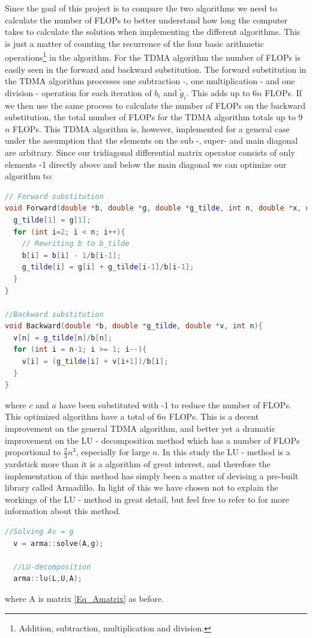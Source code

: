 \documentclass[a4paper, english]{amsart} %
\begin{document}
Since the goal of this project is to compare the two algorithms we need to calculate the number of FLOPs to better understand how long the computer takes to calculate the solution when implementing the different algorithms. This is just a matter of counting the recurrence of the four basic arithmetic operations\footnote{Addition, subtraction, multiplication and division.} in the algorithm. For the TDMA algorithm the number of FLOPs is easily seen in the forward and backward substitution. The forward substitution in the TDMA algorithm processes one subtraction -, one multiplication - and one division - operation for each iteration of $b_i$ and $\tilde{g}_i$. This adds up to 6$n$ FLOPs. If we then use the same process to calculate the number of FLOPs on the backward substitution, the total number of FLOPs for the TDMA algorithm totals up to 9$n$ FLOPs. This TDMA algorithm is, however, implemented for a general case under the assumption that the elements on the sub -, super- and main diagonal are arbitrary. Since our tridiagonal differential matrix operator consists of only elements -1 directly above and below the main diagonal we can optimize our algorithm to:
\begin{lstlisting}[language=C++, caption={Forward and backward substitution with special case}]
// Forward substitution
void Forward(double *b, double *g, double *g_tilde, int n, double *x, double h){
  g_tilde[1] = g[1];
  for (int i=2; i < n; i++){
    // Rewriting b to b_tilde
    b[i] = b[i] - 1/b[i-1];
    g_tilde[i] = g[i] + g_tilde[i-1]/b[i-1];
  }
}

//Backward substitution
void Backward(double *b, double *g_tilde, double *v, int n){
  v[n] = g_tilde[n]/b[n];
  for (int i = n-1; i >= 1; i--){
    v[i] = (g_tilde[i] + v[i+1])/b[i];
  }
}
\end{lstlisting}
where $c$ and $a$ have been substituted with -1 to reduce the number of FLOPs. This optimized algorithm have a total of 6$n$ FLOPs. This is a decent improvement on the general TDMA algorithm, and better yet a dramatic improvement on the LU - decomposition method which has a number of FLOPs proportional to $\displaystyle \frac{2}{3}n^3$, especially for large $n$. In this study the LU - method is a yardstick more than it is a algorithm of great interest, and therefore the implementation of this method has simply been a matter of devising a pre-built library called Armadillo. In light of this we have chosen not to explain the workings of the LU - method in great detail, but feel free to refer to \href{http://compphysics.github.io/ComputationalPhysics/doc/pub/linalg/pdf/linalg-print.pdf}{} for more information about this method.  
\begin{lstlisting}[language=C++, caption={Solving with Armadillo LU-decomposition}]
  //Solving Av = g
  v = arma::solve(A,g);

  //LU-decomposition
  arma::lu(L,U,A);
\end{lstlisting}
where A is matrix \eqref{Eq_Amatrix} as before.
\end{document}
